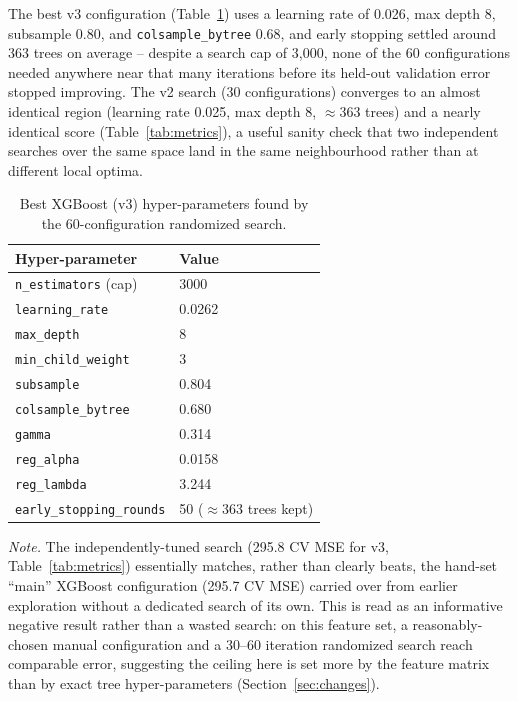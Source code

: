 \documentclass[journal]{IEEEtran}
\begin{document}
The best v3 configuration (Table~\ref{tab:xgbparams}) uses a learning rate of
0.026, max depth 8, subsample 0.80, and \texttt{colsample\_bytree} 0.68, and
early stopping settled around 363 trees on average -- despite a search cap of
3{,}000, none of the 60 configurations needed anywhere near that many
iterations before its held-out validation error stopped improving. The v2
search (30 configurations) converges to an almost identical region (learning
rate 0.025, max depth 8, $\approx$363 trees) and a nearly identical score
(Table~\ref{tab:metrics}), a useful sanity check that two independent searches
over the same space land in the same neighbourhood rather than at different
local optima.

\begin{table}[!t]
\caption{Best XGBoost (v3) hyper-parameters found by the 60-configuration
randomized search.}
\label{tab:xgbparams}
\centering
\begin{tabular}{ll}
\toprule
Hyper-parameter & Value \\
\midrule
\texttt{n\_estimators} (cap) & 3000 \\
\texttt{learning\_rate} & 0.0262 \\
\texttt{max\_depth} & 8 \\
\texttt{min\_child\_weight} & 3 \\
\texttt{subsample} & 0.804 \\
\texttt{colsample\_bytree} & 0.680 \\
\texttt{gamma} & 0.314 \\
\texttt{reg\_alpha} & 0.0158 \\
\texttt{reg\_lambda} & 3.244 \\
\texttt{early\_stopping\_rounds} & 50 ($\approx$363 trees kept) \\
\bottomrule
\end{tabular}
\end{table}

\noindent\emph{Note.} The independently-tuned search (295.8 CV MSE for v3,
Table~\ref{tab:metrics}) essentially matches, rather than clearly beats, the
hand-set ``main'' XGBoost configuration (295.7 CV MSE) carried over from
earlier exploration without a dedicated search of its own. This is read as an
informative negative result rather than a wasted search: on this feature set,
a reasonably-chosen manual configuration and a 30--60 iteration randomized
search reach comparable error, suggesting the ceiling here is set more by the
feature matrix than by exact tree hyper-parameters (Section~\ref{sec:changes}).
\end{document}

